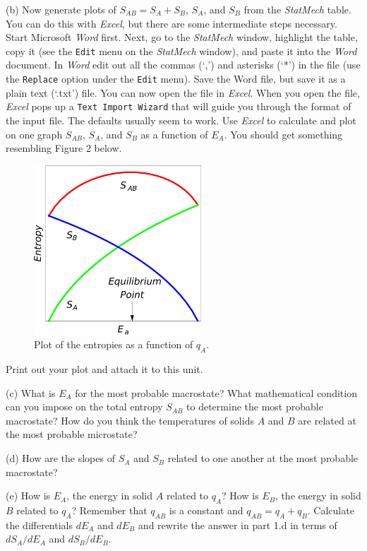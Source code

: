 (b) Now generate plots of $S_{AB}=S_A + S_B$, $S_A$, and $S_B$ from the {\it StatMech} table.
You can do this with {\it Excel}, but there are some intermediate steps necessary.
Start Microsoft {\it Word} first.
Next, go to the {\it StatMech} window, highlight the table, copy it
 (see the {\tt Edit} menu on the {\it StatMech} window), and paste it into the {\it Word}
document. 
In {\it Word} edit out all the commas (`,') and asterisks (`*') in the file 
(use the {\tt Replace}
option under the {\tt Edit} menu).
Save the Word file, but save it as a plain text (`\*.txt') file.
You can now open the file in {\it Excel}.
When you open the file, {\it Excel} pops up a {\tt Text Import Wizard} 
that will guide you through
the format of the input file.
The defaults usually seem to work.
Use {\it Excel} to calculate and plot on one graph $S_{AB}$, $S_A$, and $S_B$
as a function of $E_A$.
You should get something resembling Figure 2 below.
\begin{figure}[ht!]
\begin{center}
\includegraphics[height=2.5in]{entropy_temperature/NumberOfStates5.pdf}
\caption{Plot of the entropies as a function of $q_A$.}
\end{center}
\end{figure}
Print out your plot and attach it to this unit.

(c) What is $E_A$ for the most probable macrostate? What mathematical condition can you impose
on the total entropy $S_{AB}$ to determine the most probable macrostate?
How do you think the temperatures of solids $A$ and $B$ are related at the most probable 
microstate?
\answerspace{20mm}

(d) How are the slopes of $S_A$ and $S_B$ related to one another at the most probable
macrostate?
\answerspace{40mm}

(e) How is $E_A$, the energy in solid $A$ related to $q_A$?
How is $E_B$, the energy in solid $B$ related to $q_A$?
Remember that $q_{AB}$ is a constant and $q_{AB} = q_A + q_B$.
Calculate the differentials $dE_A$ and $dE_B$ and rewrite the answer in part 1.d
in terms of $dS_A/dE_A$ and $dS_B/dE_B$.
\answerspace{55mm}

